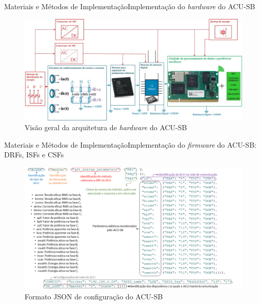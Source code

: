 \begin{frame}{Materiais e Métodos de Implementação}{Implementação do \textit{hardware} do ACU-SB}
\begin{figure}[htp]
	\centering
	\caption{ \centering\small{{Visão geral da arquitetura de \textit{hardware} do ACU-SB}}}
	\includegraphics[width=1\linewidth]{img/apSB.jpg}
    \hspace{1cm}
    \vspace{5cm}
\end{figure}
\end{frame}

\begin{frame}{Materiais e Métodos de Implementação}{Implementação do \textit{firmware} do ACU-SB: DRFs, ISFs e CSFs}
\vspace{-0.64cm}
\begin{figure}[htp]
	\centering
	\caption{ \centering\small{{Formato JSON de configuração do ACU-SB}}}
	\includegraphics[width=0.95\linewidth]{img/jsonSB.png}
    \hspace{1cm}
\end{figure}
\end{frame}

